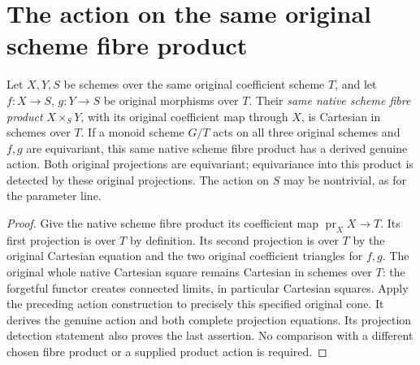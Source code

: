 \section{The action on the same original scheme fibre product}
\label{sec:scheme-equivariant-pullback}

\begin{theorem}
\label{thm:scheme-equivariant-pullback}
\leanok
{}
Let $X,Y,S$ be schemes over the same original coefficient scheme $T$,
and let $f:X\to S$, $g:Y\to S$ be original morphisms over $T$.
Their \emph{same native scheme fibre product} $X\times_SY$,
with its original coefficient map through $X$, is Cartesian
in schemes over $T$. If a monoid scheme $G/T$ acts on all
three original schemes and $f,g$ are equivariant, this same
native scheme fibre product has a derived genuine action.
Both original projections are equivariant; equivariance into
this product is detected by these original projections.
The action on $S$ may be nontrivial, as for the parameter line.
\end{theorem}

\begin{proof}
Give the native scheme fibre product its coefficient map
$\operatorname{pr}_XX\to T$. Its first projection is over $T$
by definition. Its second projection is over $T$ by the
original Cartesian equation and the two original coefficient
triangles for $f,g$. The original whole native Cartesian square
remains Cartesian in schemes over $T$: the forgetful functor
creates connected limits, in particular Cartesian squares.
Apply the preceding action construction to precisely this
specified original cone. It derives the genuine action and
both complete projection equations. Its projection detection
statement also proves the last assertion. No comparison with
a different chosen fibre product or a supplied product action
is required.
\end{proof}

